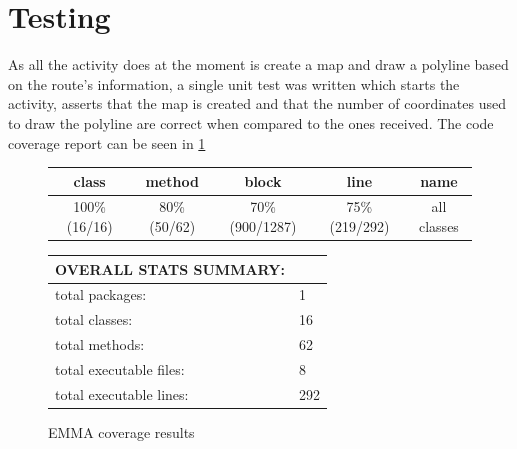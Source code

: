 \section{Testing}
As all the activity does at the moment is create a map and draw a polyline based on the route's information, a single unit test was written which starts the activity, asserts that the map is created and that the number of coordinates used to draw the polyline are correct when compared to the ones received. The code coverage report can be seen in \ref{tab:emma2}

\begin{figure}[ht]
\caption{EMMA coverage results}
\label{tab:emma2}
\begin{tabular}{| c | c | c | c | c |}
\hline
class & method & block & line & name \\ \hline
100\% (16/16) & 80\% (50/62) & 70\% (900/1287) & 75\% (219/292) & all classes \\
\hline
\end{tabular}
\vspace{10pt}

\begin{tabular}{| l | l |}
\hline
OVERALL STATS SUMMARY: & \\ \hline
total packages: & 1 \\
total classes: & 16 \\
total methods: & 62 \\
total executable files: & 8 \\
total executable lines: & 292 \\
\hline
\end{tabular}
\end{figure}

